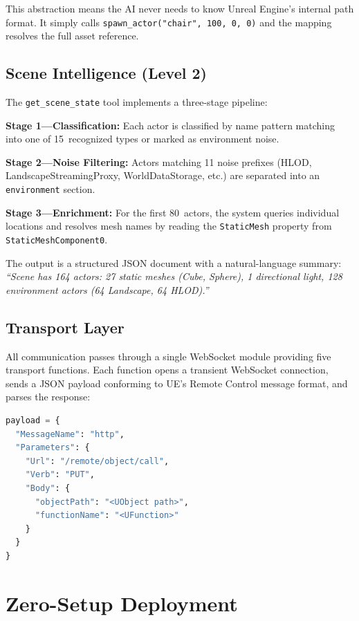 \documentclass[conference]{IEEEtran}
\begin{document}
This abstraction means the AI never needs to know Unreal Engine's internal path format. It simply calls \texttt{spawn\_actor("chair", 100, 0, 0)} and the mapping resolves the full asset reference.

\subsection{Scene Intelligence (Level 2)}

The \texttt{get\_scene\_state} tool implements a three-stage pipeline:

\textbf{Stage 1---Classification:} Each actor is classified by name pattern matching into one of 15~recognized types or marked as environment noise.

\textbf{Stage 2---Noise Filtering:} Actors matching 11 noise prefixes (HLOD, LandscapeStreamingProxy, WorldDataStorage, etc.) are separated into an \texttt{environment} section.

\textbf{Stage 3---Enrichment:} For the first 80~actors, the system queries individual locations and resolves mesh names by reading the \texttt{StaticMesh} property from \texttt{StaticMeshComponent0}.

The output is a structured JSON document with a natural-language summary: \textit{``Scene has 164 actors: 27 static meshes (Cube, Sphere), 1 directional light, 128 environment actors (64 Landscape, 64 HLOD).''}

\subsection{Transport Layer}

All communication passes through a single WebSocket module providing five transport functions. Each function opens a transient WebSocket connection, sends a JSON payload conforming to UE's Remote Control message format, and parses the response:

\begin{lstlisting}[language=Python, caption=Remote Control message format]
payload = {
  "MessageName": "http",
  "Parameters": {
    "Url": "/remote/object/call",
    "Verb": "PUT",
    "Body": {
      "objectPath": "<UObject path>",
      "functionName": "<UFunction>"
    }
  }
}
\end{lstlisting}

\section{Zero-Setup Deployment}
\end{document}
